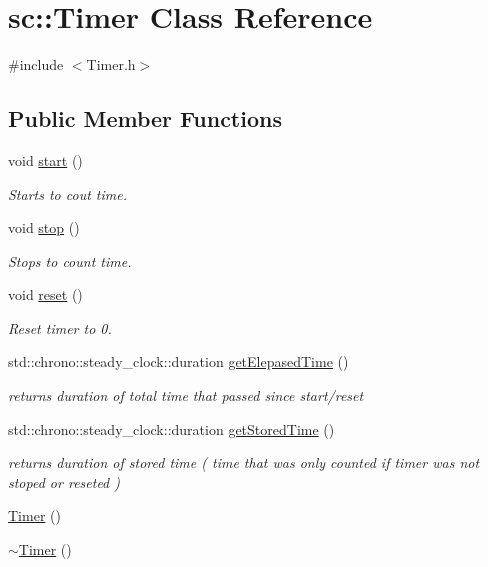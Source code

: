 \hypertarget{classsc_1_1_timer}{}\section{sc\+::Timer Class Reference}
\label{classsc_1_1_timer}


{\ttfamily \#include $<$Timer.\+h$>$}

\subsection*{Public Member Functions}
\begin{DoxyCompactItemize}
\item 
void \mbox{\hyperlink{classsc_1_1_timer_a3a8b5272198d029779dc9302a54305a8}{start}} ()
\begin{DoxyCompactList}\small\item\em Starts to cout time. \end{DoxyCompactList}\item 
void \mbox{\hyperlink{classsc_1_1_timer_a63f0eb44b27402196590a03781515dba}{stop}} ()
\begin{DoxyCompactList}\small\item\em Stops to count time. \end{DoxyCompactList}\item 
void \mbox{\hyperlink{classsc_1_1_timer_a9020542d73357a4eef512eefaf57524b}{reset}} ()
\begin{DoxyCompactList}\small\item\em Reset timer to 0. \end{DoxyCompactList}\item 
std\+::chrono\+::steady\+\_\+clock\+::duration \mbox{\hyperlink{classsc_1_1_timer_aad547701ae3ed5f294a9db485b9277e0}{get\+Elepased\+Time}} ()
\begin{DoxyCompactList}\small\item\em returns duration of total time that passed since start/reset \end{DoxyCompactList}\item 
std\+::chrono\+::steady\+\_\+clock\+::duration \mbox{\hyperlink{classsc_1_1_timer_a4e79e854f3a54d89822cc9c459742988}{get\+Stored\+Time}} ()
\begin{DoxyCompactList}\small\item\em returns duration of stored time ( time that was only counted if timer was not stoped or reseted ) \end{DoxyCompactList}\item 
\mbox{\hyperlink{classsc_1_1_timer_a5f16e8da27d2a5a5242dead46de05d97}{Timer}} ()
\item 
\mbox{\hyperlink{classsc_1_1_timer_a14fa469c4c295c5fa6e66a4ad1092146}{$\sim$\+Timer}} ()
\end{DoxyCompactItemize}
